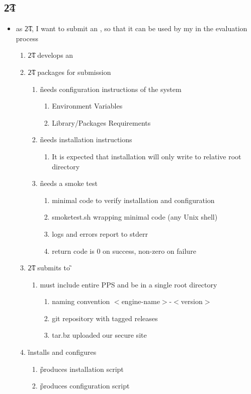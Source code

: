 \documentclass[8pt,letterpaper]{article} %
\newenvironment{slimlist}{
  \begin{itemize}
    \setlength{\topsep}{0pt}
    \setlength{\itemsep}{1pt}
    \setlength{\parsep}{0pt}
    \setlength{\parskip}{0pt}
}{\end{itemize}}
\newenvironment{mitemize}[1]{
  \subsection*{#1}
  \begin{slimlist}
}{
\end{slimlist}
\vspace{1em}
\pagebreak
}
\begin{document}
\begin{mitemize}{\t24}
\item as \t24, I want to submit an \eng, so that it can be used by my  in the evaluation process
  \begin{enumerate}
  \item \t24 develops an \eng
  \item \t24 packages \eng for submission
    \begin{enumerate}
    \item \G needs configuration instructions of the system
      \begin{enumerate}
      \item Environment Variables
      \item Library/Packages Requirements
      \end{enumerate}
    \item \G needs installation instructions
      \begin{enumerate}
      \item It is expected that installation will only write to relative root directory
      \end{enumerate}
    \item \G needs a smoke test
      \begin{enumerate}
      \item minimal code to verify \eng installation and configuration
      \item smoketest.sh wrapping minimal code (any Unix shell)
      \item logs and errors report to stderr
      \item return code is 0 on success, non-zero on failure
      \end{enumerate}
    \end{enumerate}
  \item \t24 submits \eng to \G
    \begin{enumerate}
    \item must include entire PPS and be in a single root directory
      \begin{enumerate}
      \item naming convention $<$engine-name$>$-$<$version$>$
      \item git repository with tagged releases
      \item tar.bz uploaded our secure site
      \end{enumerate}
    \end{enumerate}
  \item \G installs and configures \eng
    \begin{enumerate}
    \item \G produces \eng installation script
    \item \G produces \eng configuration script
    \end{enumerate}
  

\end{enumerate}
\end{mitemize}
\end{document}
